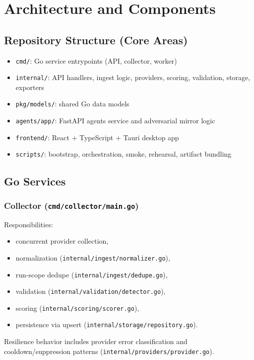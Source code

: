 \documentclass[11pt,a4paper]{article}
\begin{document}
\section{Architecture and Components}

\subsection{Repository Structure (Core Areas)}
\begin{itemize}[leftmargin=1.5em]
    \item \texttt{cmd/}: Go service entrypoints (API, collector, worker)
    \item \texttt{internal/}: API handlers, ingest logic, providers, scoring, validation, storage, exporters
    \item \texttt{pkg/models/}: shared Go data models
    \item \texttt{agents/app/}: FastAPI agents service and adversarial mirror logic
    \item \texttt{frontend/}: React + TypeScript + Tauri desktop app
    \item \texttt{scripts/}: bootstrap, orchestration, smoke, rehearsal, artifact bundling
\end{itemize}

\subsection{Go Services}

\subsubsection*{Collector (\texttt{cmd/collector/main.go})}
Responsibilities:
\begin{itemize}[leftmargin=1.5em]
    \item concurrent provider collection,
    \item normalization (\texttt{internal/ingest/normalizer.go}),
    \item run-scope dedupe (\texttt{internal/ingest/dedupe.go}),
    \item validation (\texttt{internal/validation/detector.go}),
    \item scoring (\texttt{internal/scoring/scorer.go}),
    \item persistence via upsert (\texttt{internal/storage/repository.go}).
\end{itemize}

Resilience behavior includes provider error classification and cooldown/suppression patterns (\texttt{internal/providers/provider.go}).
\end{document}
